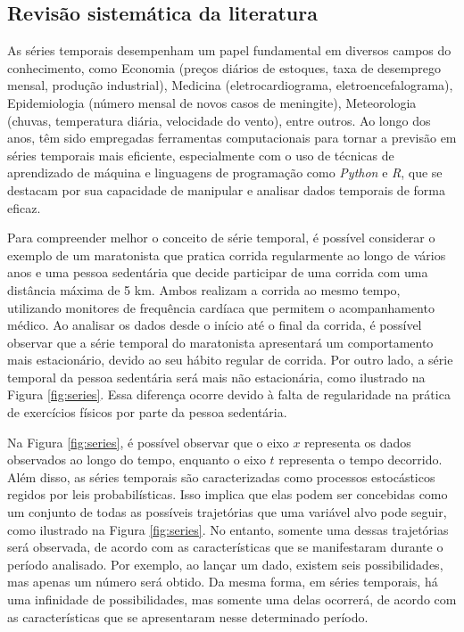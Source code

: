 \subsection{Revis\~ao sistem\'atica da literatura} \label{subsec:revisão}

As séries temporais desempenham um papel fundamental em diversos campos do conhecimento, como Economia (preços diários de estoques, taxa de desemprego mensal, produção industrial), Medicina (eletrocardiograma, eletroencefalograma), Epidemiologia (número mensal de novos casos de meningite), Meteorologia (chuvas, temperatura diária, velocidade do vento), entre outros. Ao longo dos anos, têm sido empregadas ferramentas computacionais para tornar a previsão em séries temporais mais eficiente, especialmente com o uso de técnicas de aprendizado de máquina e linguagens de programação como \textit{Python} e \textit{R}, que se destacam por sua capacidade de manipular e analisar dados temporais de forma eficaz.

Para compreender melhor o conceito de série temporal, é possível considerar o exemplo de um maratonista que pratica corrida regularmente ao longo de vários anos e uma pessoa sedentária que decide participar de uma corrida com uma distância máxima de 5 km. Ambos realizam a corrida ao mesmo tempo, utilizando monitores de frequência cardíaca que permitem o acompanhamento médico. Ao analisar os dados desde o início até o final da corrida, é possível observar que a série temporal do maratonista apresentará um comportamento mais estacionário, devido ao seu hábito regular de corrida. Por outro lado, a série temporal da pessoa sedentária será mais não estacionária, como ilustrado na Figura \ref{fig:series}. Essa diferença ocorre devido à falta de regularidade na prática de exercícios físicos por parte da pessoa sedentária.




Na Figura \ref{fig:series}, é possível observar que o eixo $x$ representa os dados observados ao longo do tempo, enquanto o eixo $t$ representa o tempo decorrido. Além disso, as séries temporais são caracterizadas como processos estocásticos regidos por leis probabilísticas. Isso implica que elas podem ser concebidas como um conjunto de todas as possíveis trajetórias que uma variável alvo pode seguir, como ilustrado na Figura \ref{fig:series}. No entanto, somente uma dessas trajetórias será observada, de acordo com as características que se manifestaram durante o período analisado. Por exemplo, ao lançar um dado, existem seis possibilidades, mas apenas um número será obtido. Da mesma forma, em séries temporais, há uma infinidade de possibilidades, mas somente uma delas ocorrerá, de acordo com as características que se apresentaram nesse determinado período.

